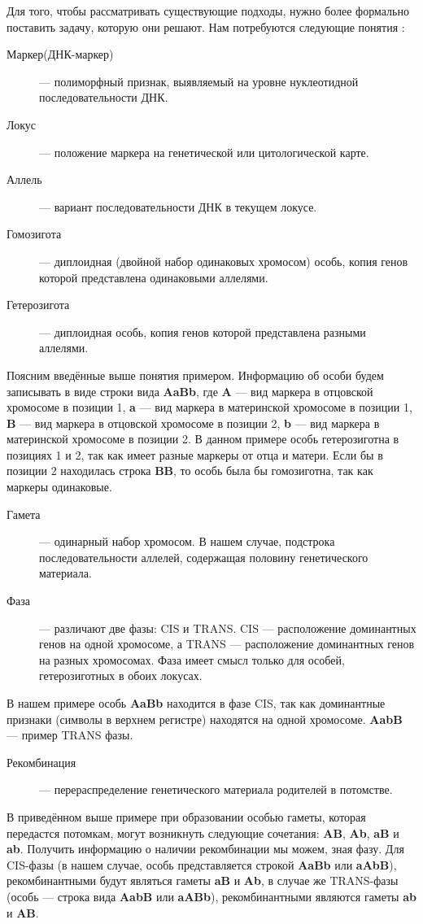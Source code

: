 \documentclass{matmex-diploma-custom}
\begin{document}
Для того, чтобы рассматривать существующие подходы, нужно более
формально поставить задачу, которую они решают. Нам
потребуются следующие понятия \cite{dictionary}:
\begin{description}
\item[Маркер(ДНК-маркер)] --- полиморфный признак,
  выявляемый на уровне нуклеотидной последовательности ДНК.
\item[Локус] --- положение маркера на генетической или
  цитологической карте.
\item[Аллель] --- вариант последовательности ДНК в текущем локусе.
\item[Гомозигота] --- диплоидная (двойной набор одинаковых
  хромосом) особь, копия генов которой представлена одинаковыми
  аллелями.
\item[Гетерозигота] --- диплоидная особь, копия генов которой
  представлена разными аллелями.
\end{description}
Поясним введённые выше понятия примером. Информацию об особи будем
записывать в виде строки вида \textbf{AaBb}, где \textbf{A} --- вид
маркера в отцовской хромосоме в позиции 1, \textbf{a} --- вид маркера
в материнской хромосоме в позиции 1, \textbf{B} --- вид маркера в
отцовской хромосоме в позиции 2, \textbf{b} --- вид маркера в
материнской хромосоме в позиции 2. В данном примере особь
гетерозиготна в позициях 1 и 2, так как имеет разные маркеры от отца и
матери. Если бы в позиции 2 находилась строка \textbf{BB}, то особь
была бы гомозиготна, так как маркеры одинаковые.

\begin{description}
\item[Гамета] --- одинарный набор хромосом. В нашем случае,
  подстрока последовательности аллелей, содержащая половину
  генетического материала.

\item[Фаза] --- различают две фазы: CIS и TRANS. CIS --- расположение
  доминантных генов на одной хромосоме, а TRANS --- расположение
  доминантных генов на разных хромосомах. Фаза имеет смысл только для
  особей, гетерозиготных в обоих локусах.
\end{description}
В нашем примере особь \textbf{AaBb} находится в фазе CIS, так как
доминантные признаки (символы в верхнем регистре) находятся на одной
хромосоме. \textbf{AabB} --- пример TRANS фазы.

\begin{description}
\item[Рекомбинация] --- перераспределение генетического материала
  родителей в потомстве.
\end{description}
В приведённом выше примере при образовании особью гаметы, которая
передастся потомкам, могут возникнуть следующие сочетания:
\textbf{AB}, \textbf{Ab}, \textbf{aB} и \textbf{ab}. Получить
информацию о наличии рекомбинации мы можем, зная фазу. Для CIS-фазы (в
нашем случае, особь представляется строкой \textbf{AaBb} или
\textbf{aAbB}), рекомбинантными будут являться гаметы \textbf{aB} и
\textbf{Ab}, в случае же TRANS-фазы (особь --- строка вида
\textbf{AabB} или \textbf{aABb}), рекомбинантными являются гаметы
\textbf{ab} и \textbf{AB}.
\end{document}
